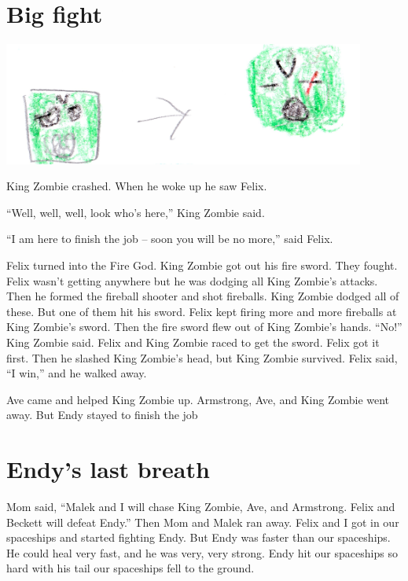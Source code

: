 \documentclass[12pt,twoside]{krantz}
\begin{document}
\hypertarget{big-fight}{%
\section{Big fight}\label{big-fight}}

\includegraphics[width=4.6875in,height=\textheight]{img/four-bad-guys/greenheads.jpg}

King Zombie crashed. When he woke up he saw Felix.

``Well, well, well, look who's here,'' King Zombie said.

``I am here to finish the job -- soon you will be no more,'' said Felix.

Felix turned into the Fire God. King Zombie got out his fire sword. They
fought. Felix wasn't getting anywhere but he was dodging all King
Zombie's attacks. Then he formed the fireball shooter and shot
fireballs. King Zombie dodged all of these. But one of them hit his
sword. Felix kept firing more and more fireballs at King Zombie's sword.
Then the fire sword flew out of King Zombie's hands. ``No!'' King Zombie
said. Felix and King Zombie raced to get the sword. Felix got it first.
Then he slashed King Zombie's head, but King Zombie survived. Felix
said, ``I win,'' and he walked away.

Ave came and helped King Zombie up. Armstrong, Ave, and King Zombie went
away. But Endy stayed to finish the job

\hypertarget{endys-last-breath}{%
\section{Endy's last breath}\label{endys-last-breath}}

Mom said, ``Malek and I will chase King Zombie, Ave, and Armstrong.
Felix and Beckett will defeat Endy.'' Then Mom and Malek ran away. Felix
and I got in our spaceships and started fighting Endy. But Endy was
faster than our spaceships. He could heal very fast, and he was very,
very strong. Endy hit our spaceships so hard with his tail our
spaceships fell to the ground.
\end{document}
